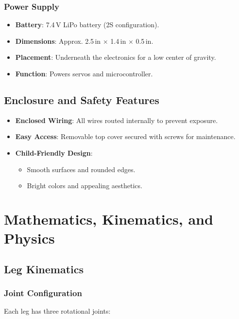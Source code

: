 \documentclass{article}
\begin{document}
\subsubsection{Power Supply}

\begin{itemize}
    \item \textbf{Battery}: 7.4\,V LiPo battery (2S configuration).
    \item \textbf{Dimensions}: Approx. 2.5\,in $\times$ 1.4\,in $\times$ 0.5\,in.
    \item \textbf{Placement}: Underneath the electronics for a low center of gravity.
    \item \textbf{Function}: Powers servos and microcontroller.
\end{itemize}

\subsection{Enclosure and Safety Features}

\begin{itemize}
    \item \textbf{Enclosed Wiring}: All wires routed internally to prevent exposure.
    \item \textbf{Easy Access}: Removable top cover secured with screws for maintenance.
    \item \textbf{Child-Friendly Design}:
    \begin{itemize}
        \item Smooth surfaces and rounded edges.
        \item Bright colors and appealing aesthetics.
    \end{itemize}
\end{itemize}

\section{Mathematics, Kinematics, and Physics}

\subsection{Leg Kinematics}

\subsubsection{Joint Configuration}

Each leg has three rotational joints:
\end{document}
